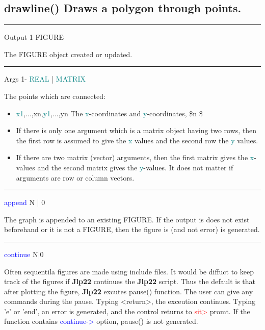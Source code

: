 \subsection{\textcolor{VioletRed}{drawline}() Draws a polygon through points.} 
\label{drawline} 
\vspace{0.3cm} 
\hrule 
\vspace{0.3cm} 
\noindent Output  \tabto{3cm}  1 \tabto{5cm}   FIGURE  \tabto{7cm} 
\begin{changemargin}{3cm}{0cm} 
\noindent  The FIGURE object created or updated. 
\end{changemargin} 
\vspace{0.3cm} 
\hrule 
\vspace{0.3cm} 
\noindent Args \tabto{3cm} 1-  \tabto{5cm}  \textcolor{teal}{REAL} | \textcolor{teal}{MATRIX}  \tabto{7cm} 
\begin{changemargin}{3cm}{0cm} 
\noindent  The points which are connected: 
\begin{itemize} 
\item  \textcolor{teal}{x1},...,xn,\textcolor{teal}{y1},...,yn The \textcolor{teal}{x}-coordinates and \textcolor{teal}{y}-coordinates, 
\$n \$ 
\item   If there is only one argument which is a 
matrix object having two rows, then the first row is assumed to give the \textcolor{teal}{x} values 
and the second row the \textcolor{teal}{y} values. 
\item   If there are two matrix (vector) arguments, then 
the first matrix gives the \textcolor{teal}{x}-values and the second matrix gives the \textcolor{teal}{y}-values. 
It does not matter if arguments are row or column vectors. 
\end{itemize} 
\end{changemargin} 
\vspace{0.3cm} 
\hrule 
\vspace{0.3cm} 
\noindent \textcolor{blue}{append} \tabto{3cm} N | 0  \tabto{5cm}    \tabto{7cm} 
\begin{changemargin}{3cm}{0cm} 
\noindent  The graph is appended to an existing FIGURE. If the output is does not exist 
beforehand or it is not a FIGURE, then the figure is (and not error) is generated. 
\end{changemargin} 
\vspace{0.3cm} 
\hrule 
\vspace{0.3cm} 
\noindent \textcolor{blue}{continue} \tabto{3cm} N|0  \tabto{5cm}    \tabto{7cm} 
\begin{changemargin}{3cm}{0cm} 
\noindent  Often sequentila figures are made using include files. It would be diffuct 
to keep track of the figures if \textbf{Jlp22} continues the \textbf{Jlp22} script. Thus the default is that 
after plotting the figure, \textbf{Jlp22} excutes \textcolor{VioletRed}{pause}() function. The user can 
give any commands during the pause. Typing <return>, the exceution continues. Typing 'e' or 'end', 
an error is generated, and the control returns to \textcolor{Red}{sit>} promt. If the function 
contains \textcolor{blue}{continue->} option, \textcolor{VioletRed}{pause}() is not generated. 
\end{changemargin} 
